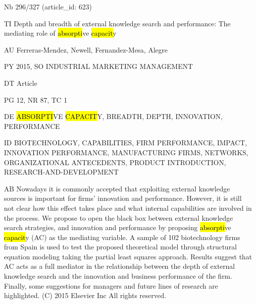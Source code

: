 \documentclass[a4paper]{article}
\begin{document}
\vspace*{-2cm}
Nb \tabto{0cm}296/327 (article\_id: 623)\par
TI \tabto{0cm}Depth and breadth of external knowledge search and performance: The mediating role of \hl{absorpti}ve \hl{capacit}y\par
AU \tabto{0cm}Ferreras-Mendez, Newell, Fernandez-Mesa, Alegre\par
PY \tabto{0cm}2015, SO INDUSTRIAL MARKETING MANAGEMENT\par
DT \tabto{0cm}Article\par
PG \tabto{0cm}12, NR 87, TC 1\par
DE \tabto{0cm}\hl{ABSORPTI}VE \hl{CAPACIT}Y, BREADTH, DEPTH, INNOVATION, PERFORMANCE\par
ID \tabto{0cm}BIOTECHNOLOGY, CAPABILITIES, FIRM PERFORMANCE, IMPACT, INNOVATION PERFORMANCE, MANUFACTURING FIRMS, NETWORKS, ORGANIZATIONAL ANTECEDENTS, PRODUCT INTRODUCTION, RESEARCH-AND-DEVELOPMENT\par
AB \tabto{0cm}Nowadays it is commonly accepted that exploiting external knowledge sources is important for firms' innovation and performance. However, it is still not clear how this effect takes place and what internal capabilities are involved in the process. We propose to open the black box between external knowledge search strategies, and innovation and performance by proposing \hl{absorpti}ve \hl{capacit}y (AC) as the mediating variable. A sample of 102 biotechnology firms from Spain is used to test the proposed theoretical model through structural equation modeling taking the partial least squares approach. Results suggest that AC acts as a full mediator in the relationship between the depth of external knowledge search and the innovation and business performance of the firm. Finally, some suggestions for managers and future lines of research are highlighted. (C) 2015 Elsevier Inc All rights reserved.\par
\clearpage
\end{document}
